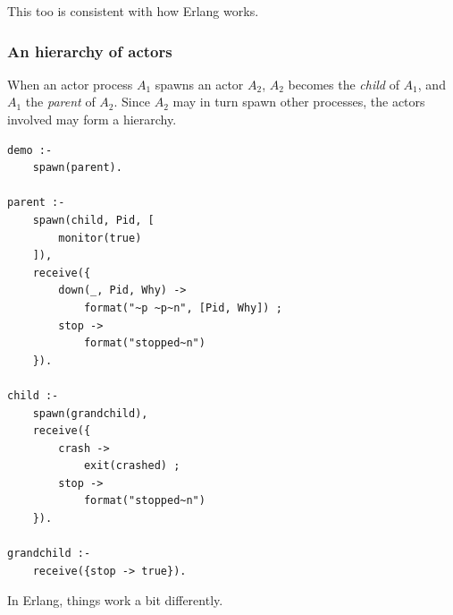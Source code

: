 \noindent This too is consistent with how Erlang works.

\subsubsection{An hierarchy of actors}

When an actor process $A_1$ spawns an actor $A_2$, $A_2$ becomes the \textit{child} of $A_1$, and $A_1$ the \textit{parent} of $A_2$. Since $A_2$ may in turn spawn other processes, the actors involved may form a hierarchy. 

\begin{verbatim}
demo :- 
    spawn(parent).

parent :-                         
    spawn(child, Pid, [
        monitor(true)
    ]),          
    receive({                 
        down(_, Pid, Why) ->       
            format("~p ~p~n", [Pid, Why]) ;
        stop -> 
            format("stopped~n")
    }).                       
                             
child :-                         
    spawn(grandchild),              
    receive({
        crash -> 
            exit(crashed) ;
        stop -> 
            format("stopped~n")
    }).                    
                             
grandchild :- 
    receive({stop -> true}). 
\end{verbatim}

\noindent In Erlang, things work a bit differently.




                                
